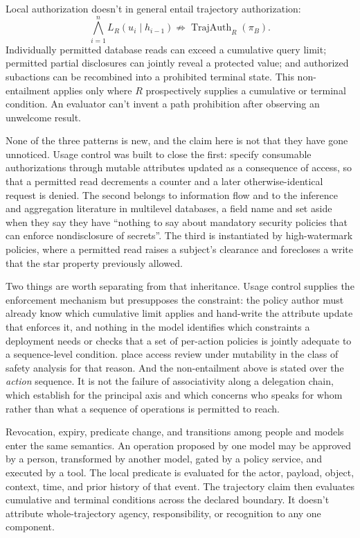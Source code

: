 Local authorization doesn't in general entail trajectory authorization:
\[
  \bigwedge_{i=1}^{n}L_R(u_i\mid h_{i-1})
  \not\Rightarrow
  \operatorname{TrajAuth}_R(\pi_B).
\]
Individually permitted database reads can exceed a cumulative query limit; permitted partial disclosures can jointly reveal a protected value; and authorized subactions can be recombined into a prohibited terminal state. This non-entailment applies only where \(R\) prospectively supplies a cumulative or terminal condition. An evaluator can't invent a path prohibition after observing an unwelcome result.

None of the three patterns is new, and the claim here is not that they have gone unnoticed. Usage control was built to close the first: \textcite{park2004ucon} specify consumable authorizations through mutable attributes updated as a consequence of access, so that a permitted read decrements a counter and a later otherwise-identical request is denied. The second belongs to information flow and to the inference and aggregation literature in multilevel databases, a field \textcite{lampson1992authentication} name and set aside when they say they have \enquote{nothing to say about mandatory security policies that can enforce nondisclosure of secrets}. The third is instantiated by high-watermark policies, where a permitted read raises a subject's clearance and forecloses a write that the star property previously allowed.

Two things are worth separating from that inheritance. Usage control supplies the enforcement mechanism but presupposes the constraint: the policy author must already know which cumulative limit applies and hand-write the attribute update that enforces it, and nothing in the model identifies which constraints a deployment needs or checks that a set of per-action policies is jointly adequate to a sequence-level condition. \Textcite{park2004ucon} place access review under mutability in the class of safety analysis for that reason. And the non-entailment above is stated over the \emph{action} sequence. It is not the failure of associativity along a delegation chain, which \textcite{abadi1993calculus} establish for the principal axis and which concerns who speaks for whom rather than what a sequence of operations is permitted to reach.

Revocation, expiry, predicate change, and transitions among people and models enter the same semantics. An operation proposed by one model may be approved by a person, transformed by another model, gated by a policy service, and executed by a tool. The local predicate is evaluated for the actor, payload, object, context, time, and prior history of that event. The trajectory claim then evaluates cumulative and terminal conditions across the declared boundary. It doesn't attribute whole-trajectory agency, responsibility, or recognition to any one component.

